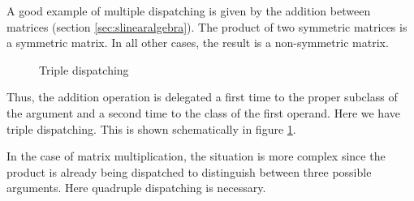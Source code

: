 \documentclass[twoside]{book}
\begin{document}
A good example of multiple dispatching is given by the addition
between matrices (\cf section \ref{sec:slinearalgebra}). The
product of two symmetric matrices is a symmetric matrix. In all
other cases, the result is a non-symmetric matrix.
\begin{figure}
\center{}
\caption{Triple dispatching}\label{fig:tripledispatch}
\end{figure}
Thus, the addition operation is delegated a first time to the
proper subclass of the argument and a second time to the class of
the first operand. Here we have triple dispatching. This is shown
schematically in figure \ref{fig:tripledispatch}.

In the case of matrix multiplication, the situation is more
complex since the product is already being dispatched to
distinguish between three possible arguments. Here quadruple
dispatching is necessary.


\ifx\wholebook\relax\else
\end{document}
